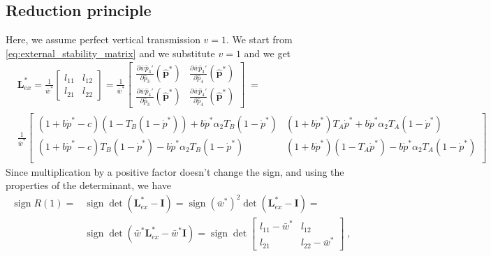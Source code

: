 \documentclass[12pt]{extarticle}
\let\vec\mathbf
\newcommand{\cl}{\mathbf{L}}
\newcommand{\ci}{\mathbf{I}}
\DeclareMathOperator{\sign}{sign}
\begin{document}
\begin{appendices}
\section{Reduction principle} \label{sec:appendixC}
Here, we assume perfect vertical transmission $v=1$. We start from \autoref{eq:external_stability_matrix} and we substitute $v=1$ and we get
\begin{equation} \label{eq:external_stability_matrix_v1}
  \begin{aligned}
  &\cl^*_{ex} = 
   \frac{1}{\bar{w}^*} \begin{bmatrix}
     l_{1 1} &
     l_{1 2} \\
     l_{2 1} &
     l_{2 2} 
  \end{bmatrix} = 
  \frac{1}{\bar{w}^*} \begin{bmatrix}
  \frac{\partial\bar{w}\hat{p}_3'}{\partial \hat{p}_3}(\vec{\hat{p}}^*) &
  \frac{\partial\bar{w}\hat{p}_3'}{\partial \hat{p}_4}(\vec{\hat{p}}^*) \\
  \frac{\partial\bar{w}\hat{p}_4'}{\partial \hat{p}_3}(\vec{\hat{p}}^*) &
  \frac{\partial\bar{w}\hat{p}_4'}{\partial \hat{p}_4}(\vec{\hat{p}}^*) 
  \end{bmatrix} \; = \\
  & \frac{1}{\bar{w}^*} \begin{bmatrix}
      (1+b \dot{p}^* -c)(1-T_B(1-\dot{p}^*)) + b \dot{p}^* \alpha_2 T_B (1-\dot{p}^*) & 
      (1+b \dot{p}^*) T_A \dot{p}^* + b \dot{p}^* \alpha_2 T_A(1-\dot{p}^*) \\
      (1+b \dot{p}^* - c) T_B(1-\dot{p}^*) - b \dot{p}^* \alpha_2 T_B (1-\dot{p}^*) &
      (1+b \dot{p}^*) (1-T_A \dot{p}^*) - b \dot{p}^* \alpha_2 T_A (1-\dot{p}^*) \\
      \end{bmatrix} \;
  \end{aligned}
  \end{equation}
Since multiplication by a positive factor doesn't change the sign, and using the properties of the determinant,  we have
\begin{equation} \label{eq:signR1}
\begin{aligned}
\sign R(1) =
& \sign\det(\cl^*_{ex} - \ci) =
  \sign (\bar{w}^*)^2 \det(\cl^*_{ex} - \ci) = \\
& \sign \det(\bar{w}^*\cl^*_{ex} - \bar{w}^* \ci) =
  \sign \det\begin{bmatrix} l_{1 1} - \bar{w}^* & l_{1 2} \\ l_{2 1} & l_{2 2} - \bar{w}^* \end{bmatrix} \;,

\end{aligned}
\end{equation}
\end{appendices}
\end{document}
